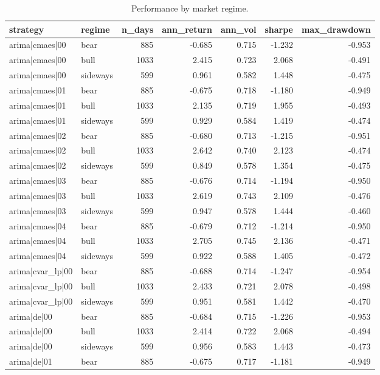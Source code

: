 \begin{table}
\caption{Performance by market regime.}
\label{tab:regimes}
\begin{tabular}{llrrrrr}
\toprule
strategy & regime & n\_days & ann\_return & ann\_vol & sharpe & max\_drawdown \\
\midrule
arima|cmaes|00 & bear & 885 & -0.685 & 0.715 & -1.232 & -0.953 \\
arima|cmaes|00 & bull & 1033 & 2.415 & 0.723 & 2.068 & -0.491 \\
arima|cmaes|00 & sideways & 599 & 0.961 & 0.582 & 1.448 & -0.475 \\
arima|cmaes|01 & bear & 885 & -0.675 & 0.718 & -1.180 & -0.949 \\
arima|cmaes|01 & bull & 1033 & 2.135 & 0.719 & 1.955 & -0.493 \\
arima|cmaes|01 & sideways & 599 & 0.929 & 0.584 & 1.419 & -0.474 \\
arima|cmaes|02 & bear & 885 & -0.680 & 0.713 & -1.215 & -0.951 \\
arima|cmaes|02 & bull & 1033 & 2.642 & 0.740 & 2.123 & -0.474 \\
arima|cmaes|02 & sideways & 599 & 0.849 & 0.578 & 1.354 & -0.475 \\
arima|cmaes|03 & bear & 885 & -0.676 & 0.714 & -1.194 & -0.950 \\
arima|cmaes|03 & bull & 1033 & 2.619 & 0.743 & 2.109 & -0.476 \\
arima|cmaes|03 & sideways & 599 & 0.947 & 0.578 & 1.444 & -0.460 \\
arima|cmaes|04 & bear & 885 & -0.679 & 0.712 & -1.214 & -0.950 \\
arima|cmaes|04 & bull & 1033 & 2.705 & 0.745 & 2.136 & -0.471 \\
arima|cmaes|04 & sideways & 599 & 0.922 & 0.588 & 1.405 & -0.472 \\
arima|cvar\_lp|00 & bear & 885 & -0.688 & 0.714 & -1.247 & -0.954 \\
arima|cvar\_lp|00 & bull & 1033 & 2.433 & 0.721 & 2.078 & -0.498 \\
arima|cvar\_lp|00 & sideways & 599 & 0.951 & 0.581 & 1.442 & -0.470 \\
arima|de|00 & bear & 885 & -0.684 & 0.715 & -1.226 & -0.953 \\
arima|de|00 & bull & 1033 & 2.414 & 0.722 & 2.068 & -0.494 \\
arima|de|00 & sideways & 599 & 0.956 & 0.583 & 1.443 & -0.473 \\
arima|de|01 & bear & 885 & -0.675 & 0.717 & -1.181 & -0.949 \\

\end{tabular}
\end{table}
